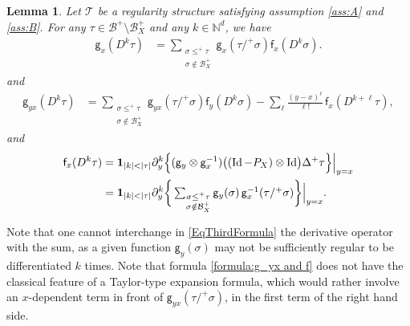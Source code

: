 \documentclass[10pt]{amsart}
\theoremstyle{plain}
\newtheorem{lem}[thm]{Lemma}
\theoremstyle{definition}
\DeclareMathOperator{\iden}{Id}
\newcommand{\sff}{\mathsf{f}}
\newcommand{\sfg}{\mathsf{g}}
\newcommand{\scrT}{\mathscr{T}}
\newcommand{\bbN}{\mathbb{N}}
\newcommand{\mcB}{\mathcal{B}}
\begin{document}
\begin{lem} \label{LemUsefulIdentities}
Let $\scrT$ be a regularity structure satisfying assumption \eqref{ass:A} and \eqref{ass:B}. For any $\tau\in\mcB^+\setminus\mcB_X^+$ and any $k\in\bbN^d$, we have
\begin{align} \label{formula:g_x and f_x}
\sfg_x(D^k\tau) &= \sum_{\substack{\sigma\leq^+\tau\\\sigma\notin\mcB_X^+}} \sfg_x(\tau/^+\sigma)\sff_x(D^k\sigma).
\end{align}
and
\begin{align} \label{formula:g_yx and f}
\sfg_{yx}(D^k\tau) &= \sum_{\substack{\sigma\leq^+\tau\\\sigma\notin\mcB_X^+}} \sfg_{yx}(\tau/^+\sigma)\sff_y(D^k\sigma) - \sum_{\ell}\frac{(y-x)^\ell}{\ell!}\,\sff_x(D^{k+\ell}\tau),
\end{align}
and
\begin{equation} \label{EqThirdFormula} \begin{split}
\sff_x(D^k\tau) &= {\bf1}_{|k|<|\tau|}\partial_y^k \Big\{({\sfg}_y\otimes\sfg_x^{-1}) \bigl((\iden -P_X)\otimes\iden \bigr) \Delta^+\tau\Big\}\Big|_{y=x} \\
 &= {\bf1}_{|k|<|\tau|}\partial_y^k \bigg\{
\textstyle\sum_{\substack{\sigma\leq^+\tau\\\sigma\notin\mcB_X^+}} \sfg_y(\sigma)\,\sfg_x^{-1}(\tau/^+\sigma)\bigg\}\Big|_{y=x}.
\end{split} \end{equation}
\end{lem}

Note that one cannot interchange in \eqref{EqThirdFormula} the derivative operator with the sum, as a given function ${\sfg}_y(\sigma)$ may not be sufficiently regular to be differentiated $k$ times. Note that formula \eqref{formula:g_yx and f} does not have the classical feature of a Taylor-type expansion formula, which would rather involve an $x$-dependent term in front of $\sfg_{yx}(\tau/^+\sigma)$, in the first term of the right hand side.
\end{document}
